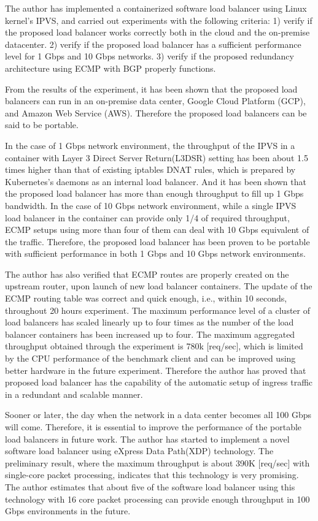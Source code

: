 The author has implemented a containerized software load balancer using Linux kernel's IPVS, and carried out experiments with the following criteria:
  1) verify if the proposed load balancer works correctly both in the cloud and the on-premise datacenter.
  2) verify if the proposed load balancer has a sufficient performance level for 1 Gbps and 10 Gbps networks.
  3) verify if the proposed redundancy architecture using ECMP with BGP properly functions.

From the results of the experiment, it has been shown that the proposed load balancers can run in an on-premise data center, Google Cloud Platform (GCP), and Amazon Web Service (AWS).
Therefore the proposed load balancers can be said to be portable.

  In the case of 1 Gbps network environment, the throughput of the IPVS in a container with Layer 3 Direct Server Return(L3DSR) setting has been about 1.5 times higher than that of existing iptables DNAT rules, which is prepared by Kubernetes's daemons as an internal load balancer. 
  And it has been shown that the proposed load balancer has more than enough throughput to fill up 1 Gbps bandwidth.
  In the case of 10 Gbps network environment, while a single IPVS load balancer in the container can provide only 1/4 of required throughput, ECMP setups using more than four of them can deal with 10 Gbps equivalent of the traffic.
  Therefore, the proposed load balancer has been proven to be portable with sufficient performance in both 1 Gbps and 10 Gbps network environments.

The author has also verified that ECMP routes are properly created on the upstream router, upon launch of new load balancer containers.
%
The update of the ECMP routing table was correct and quick enough, i.e., within 10 seconds, throughout 20 hours experiment.
The maximum performance level of a cluster of load balancers has scaled linearly up to four times as the number of the load balancer containers has been increased up to four.
The maximum aggregated throughput obtained through the experiment is 780k [req/sec], which is limited by the CPU performance of the benchmark client and can be improved using better hardware in the future experiment.
Therefore the author has proved that proposed load balancer has the capability of the automatic setup of ingress traffic in a redundant and scalable manner.

Sooner or later, the day when the network in a data center becomes all 100 Gbps will come.
  Therefore, it is essential to improve the performance of the portable load balancers in future work.
  The author has started to implement a novel software load balancer using eXpress Data Path(XDP) technology.
  The preliminary result, where the maximum throughput is about 390K [req/sec] with single-core packet processing, indicates that this technology is very promising.
%
The author estimates that about five of the software load balancer using this technology with 16 core packet processing can provide enough throughput in 100  Gbps environments in the future. 

